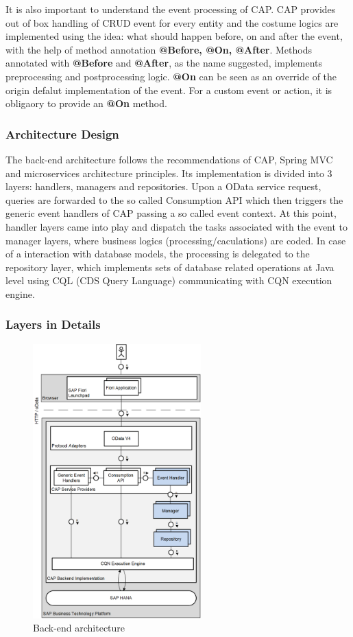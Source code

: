 \bigskip
It is also important to understand the event processing of CAP. CAP provides out of box handling of CRUD event for every entity and the costume logics are implemented using the idea: what should happen before, on and after the event, with the help of method annotation \textbf{@Before, @On, @After}. Methods annotated with \textbf{@Before} and \textbf{@After}, as the name suggested, implements preprocessing and postprocessing logic. \textbf{@On} can be seen as an override of the origin defalut implementation of the event. For a custom event or action, it is obligaory to provide an \textbf{@On} method.

\subsubsection{Architecture Design}

The back-end architecture follows the recommendations of CAP, Spring MVC and microservices architecture principles. Its implementation is divided into 3 layers: handlers, managers and repositories. Upon a OData service request, queries are forwarded to the so called Consumption API which then triggers the generic event handlers of CAP passing a so called event context. At this point, handler layers came into play and dispatch the tasks associated with the event to manager layers, where business logics (processing/caculations) are coded. In case of a interaction with database models, the processing is delegated to the repository layer, which implements sets of database related operations at Java level using CQL (CDS Query Language) communicating with CQN execution engine. 

\subsubsection{Layers in Details}

\begin{figure}[H]
	\centering
	\includegraphics[height=400px]{images/backend_architecture.png}
	\caption{Back-end architecture}
	\label{fig:backArch}
\end{figure}

